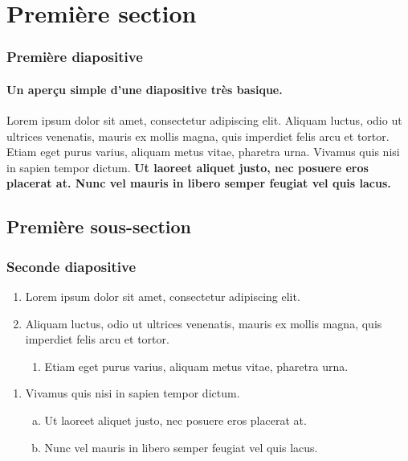 \section{Première section}
\begin{frame}
\frametitle{Première diapositive}
\framesubtitle{Un aperçu simple d'une diapositive très basique.}

Lorem ipsum dolor sit amet, consectetur adipiscing elit. Aliquam luctus, odio ut ultrices venenatis, mauris ex mollis magna, quis imperdiet felis arcu et tortor. \pause[3] Etiam eget purus varius, aliquam metus vitae, pharetra urna. Vivamus quis nisi in sapien tempor dictum. \pause[2] \textbf<3>{Ut laoreet aliquet justo, nec posuere eros placerat at. Nunc vel mauris in libero semper feugiat vel quis lacus.}

\end{frame}

\subsection{Première sous-section}
\begin{frame}
\frametitle{Seconde diapositive}

\begin{enumerate}
    \item Lorem ipsum dolor sit amet, consectetur adipiscing elit.
    \item Aliquam luctus, odio ut ultrices venenatis, mauris ex mollis magna, quis imperdiet felis arcu et tortor.
    \begin{enumerate}
        \item Etiam eget purus varius, aliquam metus vitae, pharetra urna.
    \end{enumerate}
\end{enumerate}
\begin{enumerate}[1.]
    \item Vivamus quis nisi in sapien tempor dictum.
    \begin{enumerate}[a)]
        \item Ut laoreet aliquet justo, nec posuere eros placerat at.
        \item Nunc vel mauris in libero semper feugiat vel quis lacus.
    \end{enumerate}
\end{enumerate}

\end{frame}

